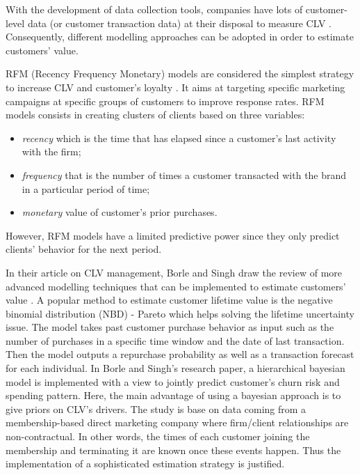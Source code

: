 \documentclass[
]{book}
\providecommand{\tightlist}{%
  \setlength{\itemsep}{0pt}\setlength{\parskip}{0pt}}
\begin{document}
With the development of data collection tools, companies have lots of customer-level data (or customer transaction data) at their disposal to measure CLV \citep{CLV_NBD}. Consequently, different modelling approaches can be adopted in order to estimate customers' value.

RFM (Recency Frequency Monetary) models are considered the simplest strategy to increase CLV and customer's loyalty \citep{CLV}. It aims at targeting specific marketing campaigns at specific groups of customers to improve response rates. RFM models consists in creating clusters of clients based on three variables:

\begin{itemize}
\tightlist
\item
  \emph{recency} which is the time that has elapsed since a customer's last activity with the firm;
\item
  \emph{frequency} that is the number of times a customer transacted with the brand in a particular period of time;
\item
  \emph{monetary} value of customer's prior purchases.
\end{itemize}

However, RFM models have a limited predictive power since they only predict clients' behavior for the next period.

In their article on CLV management, Borle and Singh draw the review of more advanced modelling techniques that can be implemented to estimate customers' value \citep{CLV_MEASUREMENT}. A popular method to estimate customer lifetime value is the negative binomial distribution (NBD) - Pareto \citep{CLV_NBD} which helps solving the lifetime uncertainty issue. The model takes past customer purchase behavior as input such as the number of purchases in a specific time window and the date of last transaction. Then the model outputs a repurchase probability as well as a transaction forecast for each individual. In Borle and Singh's research paper, a hierarchical bayesian model is implemented with a view to jointly predict customer's churn risk and spending pattern. Here, the main advantage of using a bayesian approach is to give priors on CLV's drivers. The study is base on data coming from a membership-based direct marketing company where firm/client relationships are non-contractual. In other words, the times of each customer joining the membership and terminating it are known once these events happen. Thus the implementation of a sophisticated estimation strategy is justified.
\end{document}
